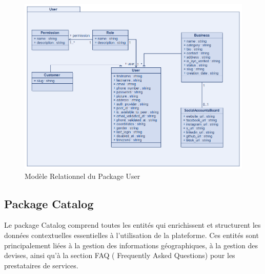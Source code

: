 \begin{figure}[H]
\begin{center}
\includegraphics[width=15cm]{assets/diagrams/UserPackage.png}
\end{center}
\caption{Modèle Relationnel du Package User}
\end{figure}
\vspace{0.35cm}

\subsection{Package Catalog}
Le package Catalog comprend toutes les entités qui enrichissent et structurent les données contextuelles essentielles à l'utilisation de la plateforme. Ces entités sont principalement liées à la gestion des informations géographiques, à la gestion des devises, ainsi qu'à la section FAQ ( Frequently Asked Questions) pour les prestataires de services. 

